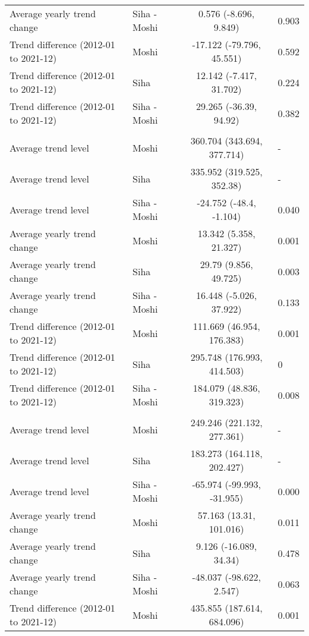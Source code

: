 \begin{longtable}{l|lcl}
Average yearly trend change & Siha - Moshi & 0.576 (-8.696, 9.849) & 0.903 \\ 
Trend difference (2012-01 to 2021-12) & Moshi & -17.122 (-79.796, 45.551) & 0.592 \\ 
Trend difference (2012-01 to 2021-12) & Siha & 12.142 (-7.417, 31.702) & 0.224 \\ 
Trend difference (2012-01 to 2021-12) & Siha - Moshi & 29.265 (-36.39, 94.92) & 0.382 \\ 
\midrule\addlinespace[2.5pt]
\multicolumn{4}{l}{Peptic Ulcers} \\ 
\midrule\addlinespace[2.5pt]
Average trend level & Moshi & 360.704 (343.694, 377.714) & - \\ 
Average trend level & Siha & 335.952 (319.525, 352.38) & - \\ 
Average trend level & Siha - Moshi & -24.752 (-48.4, -1.104) & 0.040 \\ 
Average yearly trend change & Moshi & 13.342 (5.358, 21.327) & 0.001 \\ 
Average yearly trend change & Siha & 29.79 (9.856, 49.725) & 0.003 \\ 
Average yearly trend change & Siha - Moshi & 16.448 (-5.026, 37.922) & 0.133 \\ 
Trend difference (2012-01 to 2021-12) & Moshi & 111.669 (46.954, 176.383) & 0.001 \\ 
Trend difference (2012-01 to 2021-12) & Siha & 295.748 (176.993, 414.503) & 0 \\ 
Trend difference (2012-01 to 2021-12) & Siha - Moshi & 184.079 (48.836, 319.323) & 0.008 \\ 
\midrule\addlinespace[2.5pt]
\multicolumn{4}{l}{Pneumonia, Severe} \\ 
\midrule\addlinespace[2.5pt]
Average trend level & Moshi & 249.246 (221.132, 277.361) & - \\ 
Average trend level & Siha & 183.273 (164.118, 202.427) & - \\ 
Average trend level & Siha - Moshi & -65.974 (-99.993, -31.955) & 0.000 \\ 
Average yearly trend change & Moshi & 57.163 (13.31, 101.016) & 0.011 \\ 
Average yearly trend change & Siha & 9.126 (-16.089, 34.34) & 0.478 \\ 
Average yearly trend change & Siha - Moshi & -48.037 (-98.622, 2.547) & 0.063 \\ 
Trend difference (2012-01 to 2021-12) & Moshi & 435.855 (187.614, 684.096) & 0.001 \\ 

\end{longtable}
